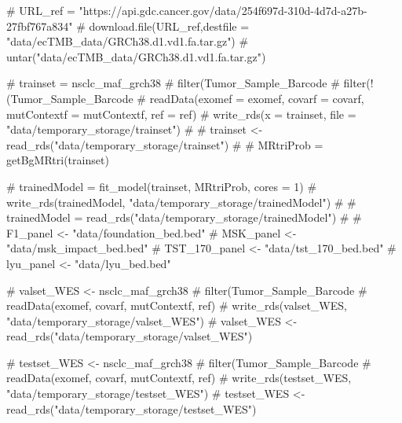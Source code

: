 # URL_ref = "https://api.gdc.cancer.gov/data/254f697d-310d-4d7d-a27b-27fbf767a834"
# download.file(URL_ref,destfile = "data/ecTMB_data/GRCh38.d1.vd1.fa.tar.gz")
# untar("data/ecTMB_data/GRCh38.d1.vd1.fa.tar.gz")

# trainset = nsclc_maf_grch38 %
#   filter(Tumor_Sample_Barcode %
#   filter(!(Tumor_Sample_Barcode %
#   readData(exomef = exomef, covarf = covarf, mutContextf = mutContextf, ref = ref)
# write_rds(x = trainset, file = "data/temporary_storage/trainset")
#
# trainset <- read_rds("data/temporary_storage/trainset")
#
# MRtriProb = getBgMRtri(trainset)

# trainedModel = fit_model(trainset, MRtriProb, cores = 1)
# write_rds(trainedModel, "data/temporary_storage/trainedModel")
#
# trainedModel = read_rds("data/temporary_storage/trainedModel")
#
# F1_panel <- "data/foundation_bed.bed"
# MSK_panel <- "data/msk_impact_bed.bed"
# TST_170_panel <- "data/tst_170_bed.bed"
# lyu_panel <- "data/lyu_bed.bed"

# valset_WES <- nsclc_maf_grch38 %
#   filter(Tumor_Sample_Barcode %
#   readData(exomef, covarf, mutContextf, ref)
# write_rds(valset_WES, "data/temporary_storage/valset_WES")
# valset_WES <- read_rds("data/temporary_storage/valset_WES")


# testset_WES <- nsclc_maf_grch38 %
#   filter(Tumor_Sample_Barcode %
#   readData(exomef, covarf, mutContextf, ref)
# write_rds(testset_WES, "data/temporary_storage/testset_WES")
# testset_WES <- read_rds("data/temporary_storage/testset_WES")

